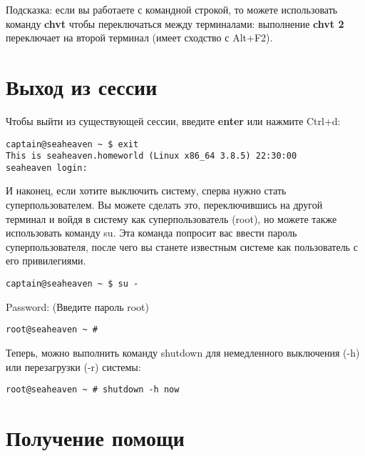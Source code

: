 \documentclass[12pt]{book}
\begin{document}
Подсказка: если вы работаете с командной строкой, то можете использовать команду \textbf{chvt} чтобы переключаться между терминалами: выполнение \textbf{chvt 2} переключает на второй терминал (имеет сходство с Alt+F2).

\section{Выход из сессии}

Чтобы выйти из существующей сессии, введите \textbf{enter} или нажмите Ctrl+d:

\vspace{3mm}
\begin{tcolorbox}
\begin{lstlisting}
captain@seaheaven ~ $ exit
This is seaheaven.homeworld (Linux x86_64 3.8.5) 22:30:00
seaheaven login:
\end{lstlisting}
\end{tcolorbox}

И наконец, если хотите выключить систему, сперва нужно стать суперпользователем. Вы можете сделать это, переключившись на другой терминал и войдя в систему как суперпользователь (root), но можете также использовать команду su. Эта команда попросит вас ввести пароль суперпользователя, после чего вы станете известным системе как пользователь с его привилегиями. 

\vspace{3mm}
\begin{tcolorbox}
\begin{lstlisting}
captain@seaheaven ~ $ su -
\end{lstlisting}
Password: (Введите пароль root)
\begin{lstlisting}
root@seaheaven ~ #
\end{lstlisting}
\end{tcolorbox}

Теперь, можно выполнить команду shutdown для немедленного выключения (-h) или перезагрузки (-r) системы:

\vspace{3mm}
\begin{tcolorbox}
\begin{lstlisting}
root@seaheaven ~ # shutdown -h now
\end{lstlisting}
\end{tcolorbox}

\section{Получение помощи}
\end{document}
